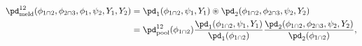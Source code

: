 \begin{align}
  \pd_{\text{meld}}^{12}(\phi_{1 \cap 2}, \phi_{2 \cap 3}, \phi_{1}, \psi_{2}, Y_{1}, Y_{2}) 
    &= 
    \pd_{1}(\phi_{1 \cap 2}, \psi_{1}, Y_{1}) \circledast \pd_{2}(\phi_{1 \cap 2}, \phi_{2 \cap 3}, \psi_{2}, Y_{2}) \\
    &=   
    \pd_{\text{pool}}^{12}(\phi_{1 \cap 2})
    \frac{
      \pd_{1}(\phi_{1 \cap 2}, \psi_{1}, Y_{1})
    } {
      \pd_{1}(\phi_{1 \cap 2})
    }
    \frac{
      \pd_{2}(\phi_{1 \cap 2}, \phi_{2 \cap 3}, \psi_{2}, Y_{2})
    } {
      \pd_{2}(\phi_{1 \cap 2})
    },
  \label{eqn:def-usual-melded-model}
\end{align}